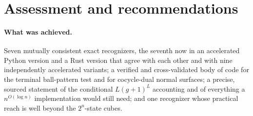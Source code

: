 \documentclass[11pt]{article}
\theoremstyle{remark}
\newcommand{\qp}{n^{O(\log n)}}
\begin{document}

































































\section{Assessment and recommendations}

\paragraph{What was achieved.}
Seven mutually consistent exact recognizers, the seventh now in an
accelerated Python version and a Rust version that agree with each other and
with nine independently accelerated variants; a verified and cross-validated
body of code for the terminal ball-pattern test and for cocycle-dual normal
surfaces; a precise, sourced statement of the conditional
$L(g+1)^L$ accounting and of everything a $\qp$ implementation would still
need; and one recognizer whose practical reach is well beyond the
$2^n$-state cubes.
\end{document}
